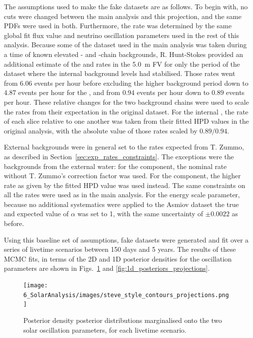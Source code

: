 The assumptions used to make the fake datasets are as follows. To begin with, no cuts were changed between the main analysis and this projection, and the same PDFs were used in both. Furthermore, the \beight{} rate was determined by the same global fit flux value and neutrino oscillation parameters used in the rest of this analysis. Because some of the dataset used in the main analysis was taken during a time of known elevated - and -chain backgrounds, R. Hunt-Stokes provided an additional estimate of the  and  rates in the \SI{5.0}{\metre} FV for only the period of the dataset where the internal background levels had stabilised. Those rates went from 6.06 events per hour before excluding the higher background period down to 4.87 events per hour for the , and from 0.94 events per hour down to 0.89 events per hour. These relative changes for the two background chains were used to scale the rates from their expectation in the original dataset. For the internal , the rate of each slice relative to one another was taken from their fitted HPD values in the original analysis, with the absolute value of those rates scaled by $0.89/0.94$.

External backgrounds were in general set to the rates expected from T. Zummo, as described in Section~\ref{sec:exp_rates_constraints}. The exceptions were the backgrounds from the external water: for the  component, the nominal rate without T. Zummo's correction factor was used. For the  component, the higher rate as given by the fitted HPD value was used instead. The same constraints on all the rates were used as in the main analysis. For the energy scale parameter, because no additional systematics were applied to the Asmiov dataset the true and expected value of $\alpha$ was set to 1, with the same uncertainty of $\pm0.0022$ as before.

Using this baseline set of assumptions, fake datasets were generated and fit over a series of livetime scenarios between 150 days and 5 years. The results of these MCMC fits, in terms of the 2D and 1D posterior densities for the oscillation parameters are shown in Figs.~\ref{fig:2d_posteriors_projections} and \ref{fig:1d_posteriors_projections}.

\begin{figure}
    \centering
    \texttt{[image: 6\_SolarAnalysis/images/steve\_style\_contours\_projections.png]}
    \caption[Posterior density posterior distributions marginalised onto the two solar oscillation parameters, for each livetime scenario]
    {Posterior density posterior distributions marginalised onto the two solar oscillation parameters, for each livetime scenario.}
    \label{fig:2d_posteriors_projections}
\end{figure}



